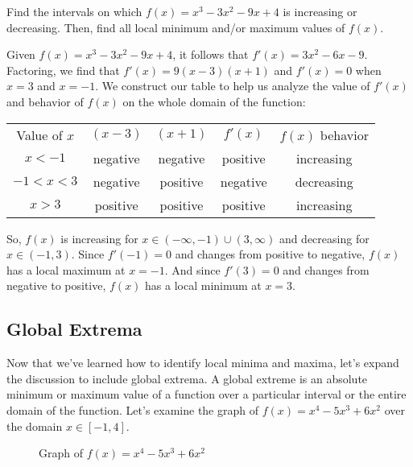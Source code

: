 \begin{Exercise}[label=locext1]
Find the intervals on which $f(x)=x^3-3x^2-9x+4$ is increasing or decreasing. 
Then, find all local minimum and/or maximum values of $f(x)$. 
\end{Exercise}

\begin{Answer}[ref=locext1]
Given $f(x)=x^3-3x^2-9x+4$, it follows that $f'(x)=3x^2-6x-9$. Factoring, we 
find that $f'(x) = 9(x-3)(x+1)$ and $f'(x) = 0$ when $x=3$ and $x=-1$. We 
construct our table to help us analyze the value of $f'(x)$ and behavior of 
$f(x)$ on the whole domain of the function:
\begin{center}
	\begin{tabular}{c|c|c|c|c}
		Value of $x$ & $(x-3)$ & $(x+1)$ & $f'(x)$ & $f(x)$ behavior\\
		$x<-1$ & negative & negative & positive & increasing\\
		$-1<x<3$ & negative & positive & negative & decreasing\\
		$x>3$ & positive & positive & positive & increasing
	\end{tabular}
\end{center}
So, $f(x)$ is increasing for $x \in (-\infty, -1) \cup (3, \infty)$ and 
decreasing for $x \in (-1, 3)$. Since $f'(-1)=0$ and changes from positive to 
negative, $f(x)$ has a local maximum at $x=-1$. And since $f'(3)=0$ and 
changes from negative to positive, $f(x)$ has a local minimum at $x=3$.
\end{Answer}



\subsection{Global Extrema}
Now that we've learned how to identify local minima and maxima, let's expand 
the discussion to include global extrema. A global extreme is an absolute 
minimum or maximum value of a function over a particular interval or the entire 
domain of the function. Let's examine the graph of $f(x) = x^4-5x^3+6x^2$ over 
the domain $x \in [-1,4]$.

\begin{figure}[htbp]
  \centering
  \caption{Graph of \( f(x) = x^4-5x^3+6x^2 \) }
  \label{fig:globalext}
\end{figure}

